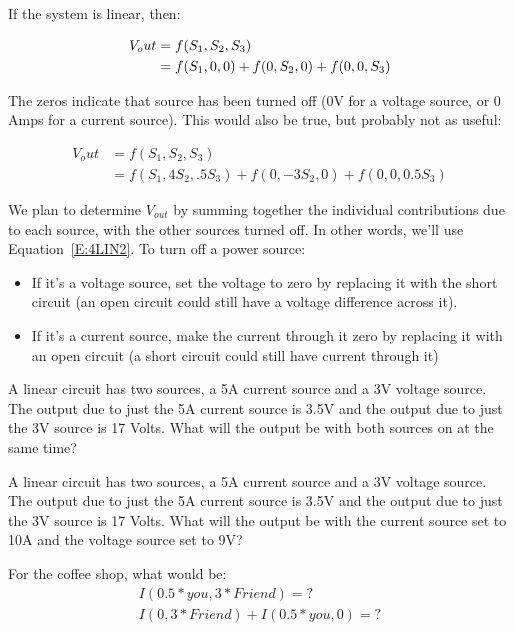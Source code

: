 If the system is linear, then:
\par
\begin{align}
V_out &= f(S_1,S_2,S_3) \notag\\
	&= f(S_1,0,0)+f(0,S_2,0)+f(0,0,S_3) \label{E:4LIN2}
\end{align}

The zeros indicate that source has been turned off (0V for a voltage source, or 0 Amps for a current source). This would also be true, but probably not as useful:
\par
\begin{align}
V_out &= f(S_1,S_2,S_3) \\
	&= f(S_1,4S_2,.5S_3)+f(0,-3S_2,0)+f(0,0,0.5S_3)
\end{align}

We plan to determine $V_{out}$ by summing together the individual contributions due to each source, with the other sources turned off. In other words, we'll use Equation~\eqref{E:4LIN2}. To turn off a power source:\

\begin{itemize}
\item If it's a voltage source, set the voltage to zero by replacing it with the short circuit (an open circuit could still have a voltage difference across it).
\item If it's a current source, make the current through it zero by replacing it with an open circuit (a short circuit could still have current through it)
\end{itemize}

\begin{blevel}
A linear circuit has two sources, a 5A current source and a 3V voltage source. The output due to just the 5A current source is 3.5V and the output due to just the 3V source is 17 Volts. What will the output be with both sources on at the same time?
\end{blevel}

\begin{clevel}
A linear circuit has two sources, a 5A current source and a 3V voltage source. The output due to just the 5A current source is 3.5V and the output due to just the 3V source is 17 Volts. What will the output be with the current source set to 10A and the voltage source set to 9V?
\end{clevel}

\begin{alevel}
For the coffee shop, what would be:
\begin{align*}
I(0.5*you,3*Friend)=?\\
I(0,3*Friend)+I(0.5*you,0)=?
\end{align*}
\end{alevel}

